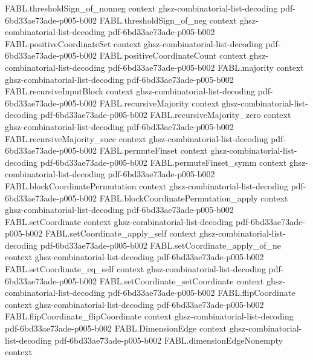 \begin{theorem}
\proofstep
  {FABL.thresholdSign_of_nonneg}
  {context}
  {ghsz-combinatorial-list-decoding}
  {pdf-6bd33ae73ade-p005-b002}
\proofstep
  {FABL.thresholdSign_of_neg}
  {context}
  {ghsz-combinatorial-list-decoding}
  {pdf-6bd33ae73ade-p005-b002}
\proofstep
  {FABL.positiveCoordinateSet}
  {context}
  {ghsz-combinatorial-list-decoding}
  {pdf-6bd33ae73ade-p005-b002}
\proofstep
  {FABL.positiveCoordinateCount}
  {context}
  {ghsz-combinatorial-list-decoding}
  {pdf-6bd33ae73ade-p005-b002}
\proofstep
  {FABL.majority}
  {context}
  {ghsz-combinatorial-list-decoding}
  {pdf-6bd33ae73ade-p005-b002}
\proofstep
  {FABL.recursiveInputBlock}
  {context}
  {ghsz-combinatorial-list-decoding}
  {pdf-6bd33ae73ade-p005-b002}
\proofstep
  {FABL.recursiveMajority}
  {context}
  {ghsz-combinatorial-list-decoding}
  {pdf-6bd33ae73ade-p005-b002}
\proofstep
  {FABL.recursiveMajority_zero}
  {context}
  {ghsz-combinatorial-list-decoding}
  {pdf-6bd33ae73ade-p005-b002}
\proofstep
  {FABL.recursiveMajority_succ}
  {context}
  {ghsz-combinatorial-list-decoding}
  {pdf-6bd33ae73ade-p005-b002}
\proofstep
  {FABL.permuteFinset}
  {context}
  {ghsz-combinatorial-list-decoding}
  {pdf-6bd33ae73ade-p005-b002}
\proofstep
  {FABL.permuteFinset_symm}
  {context}
  {ghsz-combinatorial-list-decoding}
  {pdf-6bd33ae73ade-p005-b002}
\proofstep
  {FABL.blockCoordinatePermutation}
  {context}
  {ghsz-combinatorial-list-decoding}
  {pdf-6bd33ae73ade-p005-b002}
\proofstep
  {FABL.blockCoordinatePermutation_apply}
  {context}
  {ghsz-combinatorial-list-decoding}
  {pdf-6bd33ae73ade-p005-b002}
\proofstep
  {FABL.setCoordinate}
  {context}
  {ghsz-combinatorial-list-decoding}
  {pdf-6bd33ae73ade-p005-b002}
\proofstep
  {FABL.setCoordinate_apply_self}
  {context}
  {ghsz-combinatorial-list-decoding}
  {pdf-6bd33ae73ade-p005-b002}
\proofstep
  {FABL.setCoordinate_apply_of_ne}
  {context}
  {ghsz-combinatorial-list-decoding}
  {pdf-6bd33ae73ade-p005-b002}
\proofstep
  {FABL.setCoordinate_eq_self}
  {context}
  {ghsz-combinatorial-list-decoding}
  {pdf-6bd33ae73ade-p005-b002}
\proofstep
  {FABL.setCoordinate_setCoordinate}
  {context}
  {ghsz-combinatorial-list-decoding}
  {pdf-6bd33ae73ade-p005-b002}
\proofstep
  {FABL.flipCoordinate}
  {context}
  {ghsz-combinatorial-list-decoding}
  {pdf-6bd33ae73ade-p005-b002}
\proofstep
  {FABL.flipCoordinate_flipCoordinate}
  {context}
  {ghsz-combinatorial-list-decoding}
  {pdf-6bd33ae73ade-p005-b002}
\proofstep
  {FABL.DimensionEdge}
  {context}
  {ghsz-combinatorial-list-decoding}
  {pdf-6bd33ae73ade-p005-b002}
\proofstep
  {FABL.dimensionEdgeNonempty}
  {context}

\end{theorem}
